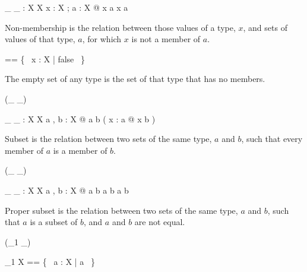 \documentclass[draft,a4paper,10pt,wd]{isov2}
\begin{document}
\begin{gendef}[X]
\_ \notin \_ : X \rel \power X
\where
\forall x : X ; a : \power X @ x \notin a \iff \lnot x \in a
\end{gendef}

Non-membership is the relation between those values of a type, $x$,
and sets of values of that type, $a$,
for which $x$ is not a member of $a$.


\begin{zed}
\emptyset [ X ] == \{~ x : X | false ~\}
\end{zed}

The empty set of any type is the set of that
type that has no members.


\begin{zed}
\relation (\_ \subseteq \_)
\end{zed}

\begin{gendef}[X]
\_ \subseteq \_ : \power X \rel \power X
\where
\forall a , b : \power X @ a \subseteq b \iff
( \forall x : a @ x \in b )
\end{gendef}

Subset is the relation between two sets of the same type, $a$ and $b$,
such that every member of $a$ is a member of $b$.


\begin{zed}
\relation (\_ \subset \_)
\end{zed}

\begin{gendef}[X]
\_ \subset \_ : \power X \rel \power X
\where
\forall a , b : \power X @ a \subset b \iff
a \subseteq b \land a \neq b
\end{gendef}

Proper subset is the relation between two
sets of the same type, $a$ and $b$,
such that $a$ is a subset of $b$,
and $a$ and $b$ are not equal.


\begin{zed}
\generic (\power_1 \_)
\end{zed}

\begin{zed}
\power_1 X == \{~ a : \power X | a \neq \emptyset ~\}
\end{zed}
\end{document}
